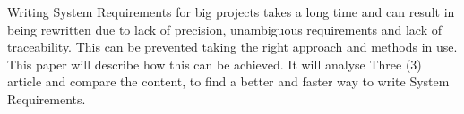 \documentclass[Main]{subfiles}
\begin{document}
\noindent 
Writing System Requirements for big projects takes a long time and can result in being rewritten due to lack of precision, unambiguous requirements and lack of traceability.
This can be prevented taking the right approach and methods in use.
This paper will describe how this can be achieved.
It will analyse Three (3) article and compare the content, to find a better and faster way to write System Requirements.
\end{document}
